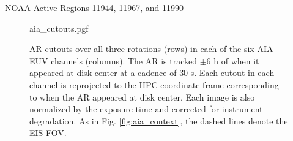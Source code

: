 \documentclass[final]{beamer}
\newlength{\colwidth}
\begin{document}
\begin{frame}[t]
\begin{columns}[t]
\begin{column}{\colwidth}
\begin{block}{NOAA Active Regions 11944, 11967, and 11990}
    \vspace{-35pt}
  
    \begin{figure}
      \centering
      {aia_cutouts.pgf}
      \caption{AR cutouts over all three rotations (rows) in each of the six AIA EUV channels (columns). The AR is tracked $\pm6$ h of when it appeared at disk center at a cadence of 30 s. Each cutout in each channel is reprojected to the HPC coordinate frame corresponding to when the AR appeared at disk center. Each image is also normalized by the exposure time and corrected for instrument degradation. As in Fig. \autoref{fig:aia_context}, the dashed lines denote the EIS FOV.} 
      \label{fig:aia_cutouts}
    \end{figure}

    \vspace{-35pt}


\end{block}
\end{column}
\end{columns}
\end{frame}
\end{document}
